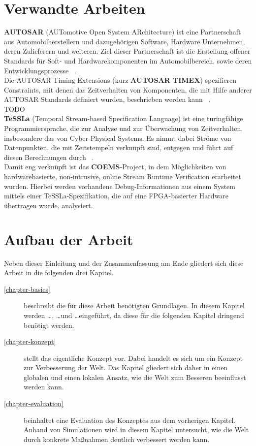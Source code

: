 \section{Verwandte Arbeiten}

\textbf{AUTOSAR} (AUTomotive Open System ARchitecture) ist eine Partnerschaft aus Automobilherstellern und dazugehörigen Software, Hardware Unternehmen, deren Zulieferern und weiteren. Ziel dieser Partnerschaft ist die Erstellung offener Standards für Soft- und Hardwarekomponenten im Automobilbereich, sowie deren Entwicklungsprozesse ~\cite{AUTOSAR_History}.\\
Die AUTOSAR Timing Extensions (kurz \textbf{AUTOSAR TIMEX}) spezifieren Constraints, mit denen das Zeitverhalten von Komponenten, die mit Hilfe anderer AUTOSAR Standards definiert wurden, beschrieben werden kann ~\cite{TIMEX}.\\
TODO ~\cite{TIMMO2USE}\\
\textbf{TeSSLa} (Temporal Stream-based Specification Language) ist eine turingfähige Programmiersprache, die zur Analyse und zur Überwachung von Zeitverhalten, insbesondere das von Cyber-Physical Systems. Es nimmt dabei Ströme von Datenpunkten, die mit Zeitstempeln verknüpft sind, entgegen und führt auf diesen Berechnungen durch ~\cite{TeSSLa}.\\
Damit eng verknüpft ist das \textbf{COEMS}-Project, in dem Möglichkeiten von hardwarebasierte, non-intrusive, online Stream Runtime Verification erarbeitet wurden. Hierbei werden vorhandene Debug-Informationen aus einem System mittels einer TeSSLa-Spezifikation, die auf eine FPGA-basierter Hardware übertragen wurde, analysiert.





\section{Aufbau der Arbeit}

Neben dieser Einleitung und der Zusammenfassung am Ende gliedert sich diese Arbeit in die folgenden drei Kapitel.
\begin{description}
  \item[\ref{chapter-basics}] beschreibt die für diese Arbeit benötigten Grundlagen. In diesem Kapitel werden \ldots, \ldots und \ldots eingeführt, da diese für die folgenden Kapitel dringend benötigt werden.
  \item[\ref{chapter-konzept}] stellt das eigentliche Konzept vor. Dabei handelt es sich um ein Konzept zur Verbesserung der Welt. Das Kapitel gliedert sich daher in einen globalen und einen lokalen Ansatz, wie die Welt zum Besseren beeinflusst werden kann.
  \item[\ref{chapter-evaluation}] beinhaltet eine Evaluation des Konzeptes aus dem vorherigen Kapitel. Anhand von Simulationen wird in diesem Kapitel untersucht, wie die Welt durch konkrete Maßnahmen deutlich verbessert werden kann.
\end{description}

